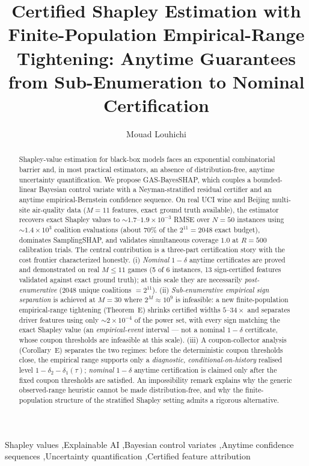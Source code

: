 \documentclass[preprint,12pt]{elsarticle}
\begin{document}
\begin{frontmatter}

\title{Certified Shapley Estimation with Finite-Population Empirical-Range Tightening: Anytime Guarantees from Sub-Enumeration to Nominal Certification}

\author[aff1]{Mouad Louhichi}

\begin{abstract}
Shapley-value estimation for black-box models faces an exponential combinatorial barrier and, in most practical estimators, an absence of distribution-free, anytime uncertainty quantification. We propose GAS-BayesSHAP, which couples a bounded-linear Bayesian control variate with a Neyman-stratified residual certifier and an anytime empirical-Bernstein confidence sequence. On real UCI wine and Beijing multi-site air-quality data ($M=11$ features, exact ground truth available), the estimator recovers exact Shapley values to $\sim\!1.7$--$1.9\times10^{-3}$ RMSE over $N=50$ instances using $\sim\!1.4\times10^3$ coalition evaluations (about $70\%$ of the $2^{11}=2048$ exact budget), dominates SamplingSHAP, and validates simultaneous coverage $1.0$ at $R=500$ calibration trials. The central contribution is a three-part certification story with the cost frontier characterized honestly. (i) \emph{Nominal} $1-\delta$ anytime certificates are proved and demonstrated on real $M\le 11$ games (5 of 6 instances, 13 sign-certified features validated against exact ground truth); at this scale they are necessarily \emph{post-enumerative} ($2048$ unique coalitions $=2^{11}$). (ii) \emph{Sub-enumerative empirical sign separation} is achieved at $M=30$ where $2^M\approx10^9$ is infeasible: a new finite-population empirical-range tightening (Theorem~E) shrinks certified widths $5$--$34\times$ and separates driver features using only $\sim\!2\times10^{-4}$ of the power set, with every sign matching the exact Shapley value (an \emph{empirical-event} interval --- not a nominal $1-\delta$ certificate, whose coupon thresholds are infeasible at this scale). (iii) A coupon-collector analysis (Corollary~E) separates the two regimes: before the deterministic coupon thresholds close, the empirical range supports only a \emph{diagnostic, conditional-on-history} realised level $1-\delta_2-\delta_1(\tau)$; \emph{nominal} $1-\delta$ anytime certification is claimed only after the fixed coupon thresholds are satisfied. An impossibility remark explains why the generic observed-range heuristic cannot be made distribution-free, and why the finite-population structure of the stratified Shapley setting admits a rigorous alternative.
\end{abstract}

\begin{keyword}
Shapley values \sep Explainable AI \sep Bayesian control variates \sep Anytime confidence sequences \sep Uncertainty quantification \sep Certified feature attribution
\end{keyword}

\end{frontmatter}
\end{document}
